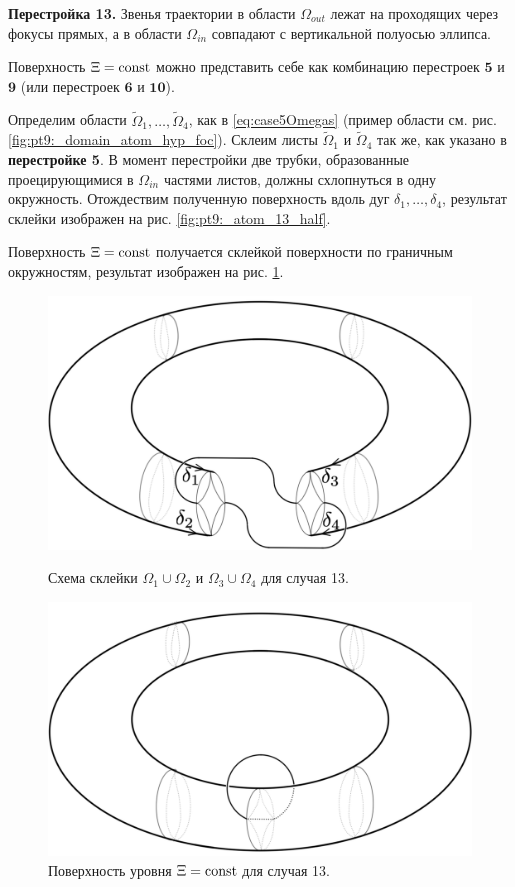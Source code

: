 \textbf{Перестройка 13.}
Звенья траектории в области $\Omega_{out}$ лежат на проходящих через фокусы прямых, а в области $\Omega_{in}$ совпадают с вертикальной полуосью эллипса.

Поверхность $\Xi = \mathrm{const}$ можно представить себе как комбинацию перестроек $\textbf{5}$ и $\textbf{9}$ (или перестроек $\textbf{6}$ и $\textbf{10}$).

Определим области $\widetilde{\Omega}_1, \ldots, \widetilde{\Omega}_4$, как в \eqref{eq:case5Omegas} (пример области см. рис. \ref{fig:pt9:_domain_atom_hyp_foc}).
Склеим листы $\widetilde{\Omega}_1$ и  $\widetilde{\Omega}_4$ так же, как указано в \textbf{перестройке 5}. В момент перестройки две трубки, образованные проецирующимися в $\Omega_{in}$ частями листов, должны схлопнуться в одну окружность. Отождествим полученную поверхность вдоль дуг $\delta_1, \ldots, \delta_4$, результат склейки изображен на  рис. \ref{fig:pt9:_atom_13_half}.

Поверхность $\Xi = \mathrm{const}$ получается склейкой поверхности по граничным окружностям, результат изображен на рис. \ref{fig:pt9:_atom_13}.

\begin{figure}[!htb]
\centering
\includegraphics[scale=0.1]{images/section2/atoms/atom_13_half.pdf}
    \caption{Схема склейки $\Omega_1 \cup \Omega_2$ и $\Omega_3 \cup \Omega_4$ для случая 13.}
    \label{fig:pt9:_atom_13_half}
\endminipage\hfill
{}
\centering
\includegraphics[scale=0.1]{images/section2/atoms/atom_13.pdf}
    \caption{Поверхность уровня $\Xi = \mathrm{const}$ для случая 13.}
    \label{fig:pt9:_atom_13}
\endminipage\hfill
\end{figure}

